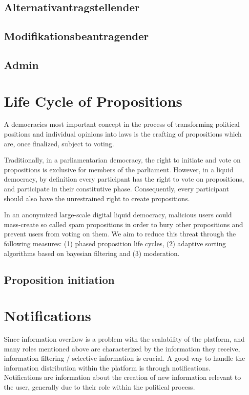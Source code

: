 \subsection{Alternativantragstellender}
\label{ssec:Roles_Alternativantragstellender}

\subsection{Modifikationsbeantragender}
\label{ssec:Roles_Modifikationsbeantragender}

\subsection{Admin}
\label{ssec:Roles_Admin}

\section{Life Cycle of Propositions}
\label{sec:Model_Propositions}
A democracies most important concept in the process of transforming political positions and individual opinions into laws is the crafting of propositions which are, once finalized, subject to voting.

Traditionally, in a parliamentarian democracy, the right to initiate and vote on propositions is exclusive for members of the parliament.
However, in a liquid democracy, by definition every participant has the right to vote on propositions, and participate in their constitutive phase. Consequently, every participant should also have the unrestrained right to create propositions.

In an anonymized large-scale digital liquid democracy, malicious users could mass-create so called spam propositions in order to bury other propositions and prevent users from voting on them.
We aim to reduce this threat through the following measures: (1) phased proposition life cycles, (2) adaptive sorting algorithms based on bayesian filtering and (3) moderation.

\subsection{Proposition initiation}

\section{Notifications}
\label{sec:Notifications}
Since information overflow is a problem with the scalability of the platform, and many roles mentioned above are characterized by the information they receive, information filtering / selective information is crucial. A good way to handle the information distribution within the platform is through notifications. Notifications are information about the creation of new information relevant to the user, generally due to their role within the political process.

